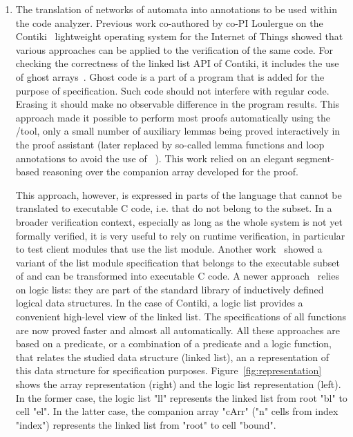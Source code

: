\begin{enumerate}[labelsep=3pt,leftmargin=12pt]
\item The translation of networks of automata into annotations to be used within the \framac code analyzer.
  Previous work co-authored by  co-PI Loulergue on the Contiki~\cite{DGV2004:LCN} lightweight operating system for the Internet of Things showed that various   approaches can be applied to the verification of the same code.
  For checking the correctness of the linked list API of Contiki, it includes the use of ghost arrays~\cite{BKL2018:NFM}.
  Ghost code is a part of a program that is added for the purpose of specification.
  Such code should not interfere with regular code.
  Erasing it should make no observable difference in the program results.
  This approach made it possible to perform most proofs automatically using the \framac/\Wp tool, only a small number of auxiliary lemmas being proved interactively in the \Coq proof assistant
  (later replaced by so-called lemma functions and loop annotations to avoid the use of \Coq~\cite{BLK2019:NFM}).
  This work relied on an elegant segment-based reasoning over the companion array developed for the proof.
  
  This approach, however, is expressed in parts of the \acsl language that cannot be translated to executable C code, i.e. that do not belong to the \eacsl subset.
  In a broader verification context, especially as long as the whole system is not yet formally verified, it is very useful to rely on runtime verification, in particular to test client modules that use the list module.
  Another work~\cite{LBK2018:TAP} showed a variant of the list module specification that belongs to the executable subset \eacsl of \acsl and can be transformed into executable C code.
  A newer approach~\cite{BKL2019:SAC} relies on logic lists: they are part of the \acsl standard library of inductively defined logical data structures.
  In the case of Contiki, a logic list provides a convenient high-level view of the linked list.
  The specifications of all functions are now proved faster and almost all automatically.
  All these approaches are based on a predicate, or a combination of a predicate and a logic function, that relates the studied data structure (linked list), an a representation of this data structure for specification purposes.
  Figure~\ref{fig:representation} shows the array representation (right) and the logic list representation (left).
  In the former case, the logic list "ll" represents the linked list from root "bl" to cell "el".
  In the latter case, the companion array "cArr" ("n" cells from index "index") represents the linked list from "root" to cell "bound".



\end{enumerate}
